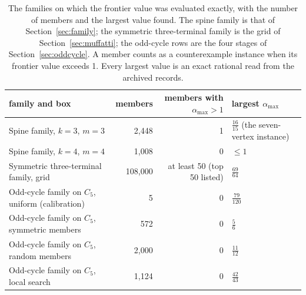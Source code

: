 \begin{table}[t]
\centering\small
\begin{tabular}{@{}>{\raggedright\arraybackslash}p{5.6cm}rr>{\raggedright\arraybackslash}p{3.4cm}@{}}
\toprule
family and box & members & members with $\alpha_{\max}>1$ & largest $\alpha_{\max}$\\
\midrule
Spine family, $k=3$, $m=3$ & 2{,}448 & 1 & $\tfrac{16}{15}$ (the seven-vertex instance)\\
Spine family, $k=4$, $m=4$ & 1{,}008 & 0 & $\le 1$\\
Symmetric three-terminal family, grid & 108{,}000 & at least 50 (top 50 listed) & \ensuremath{\tfrac{69}{64}}\\
Odd-cycle family on $C_5$, uniform (calibration) & 5 & 0 & $\tfrac{79}{120}$\\
Odd-cycle family on $C_5$, symmetric members & 572 & 0 & $\tfrac{5}{6}$\\
Odd-cycle family on $C_5$, random members & 2{,}000 & 0 & $\tfrac{11}{12}$\\
Odd-cycle family on $C_5$, local search & 1{,}124 & 0 & $\tfrac{42}{43}$\\
\bottomrule
\end{tabular}
\caption{The families on which the frontier value was evaluated exactly, with the number of members and the largest value found. The spine family is that of Section~\ref{sec:family}; the symmetric three-terminal family is the grid of Section~\ref{sec:muffatti}; the odd-cycle rows are the four stages of Section~\ref{sec:oddcycle}. A member counts as a counterexample instance when its frontier value exceeds 1. Every largest value is an exact rational read from the archived records.}
\label{tab:sweep}
\end{table}

